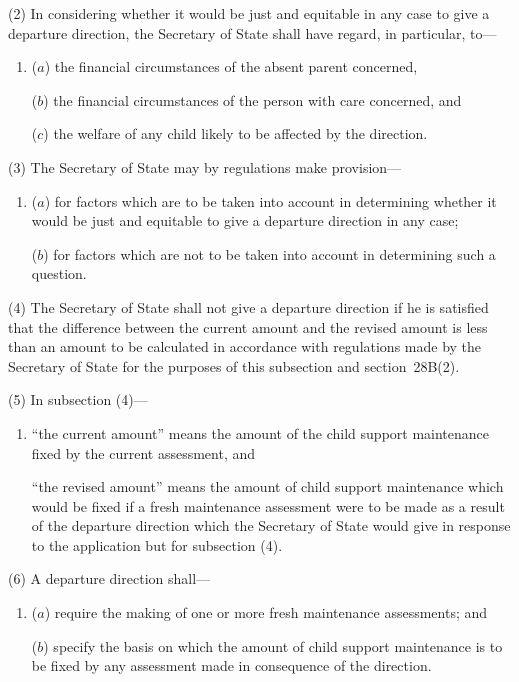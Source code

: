 \documentclass[12pt,a4paper]{article}
\begin{document}
(2) In considering whether it would be just and equitable in any case to give a departure direction, the Secretary of State shall have regard, in particular, to—
\begin{enumerate}\item[]
($a$) the financial circumstances of the absent parent concerned,

($b$) the financial circumstances of the person with care concerned, and

($c$) the welfare of any child likely to be affected by the direction.
\end{enumerate}

(3) The Secretary of State may by regulations make provision—
\begin{enumerate}\item[]
($a$) for factors which are to be taken into account in determining whether it would be just and equitable to give a departure direction in any case;

($b$) for factors which are not to be taken into account in determining such a question.
\end{enumerate}

(4) The Secretary of State shall not give a departure direction if he is satisfied that the difference between the current amount and the revised amount is less than an amount to be calculated in accordance with regulations made by the Secretary of State for the purposes of this subsection and section~28B(2).

(5) In subsection (4)—
\begin{enumerate}\item[]
    “the current amount” means the amount of the child support maintenance fixed by the current assessment, and

    “the revised amount” means the amount of child support maintenance which would be fixed if a fresh maintenance assessment were to be made as a result of the departure direction which the Secretary of State would give in response to the application but for subsection (4). 
\end{enumerate}

(6) A departure direction shall—
\begin{enumerate}\item[]
($a$) require 
the making of  %
one or more fresh maintenance assessments; and

($b$) specify the basis on which the amount of child support maintenance is to be fixed by any assessment made in consequence of the direction.
\end{enumerate}
\end{document}
